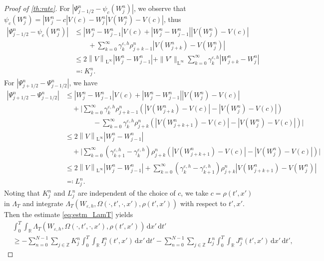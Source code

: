 \documentclass[10pt]{amsart}
\theoremstyle{plain}
\theoremstyle{definition}
\numberwithin{equation}{section}
\newcommand{\eps}{{\varepsilon}}
\newcommand{\norm}[1]{\left\lVert#1\right\rVert}
\newcommand{\dt}{{\, \mathrm{d}t}}
\newcommand{\dx}{{\, \mathrm{d}x}}
\begin{document}
\begin{proof}[Proof of \cref{th:rate}]
For $\left|\Psi_{j-1/2}^n - \psi_c(W_j^n)\right|$, we observe that $\psi_c(W_j^n) = |W_j^n-c|V(c) - W_j^n\left|V(W_j^n)-V(c)\right|$,
thus
\begin{align*}
    \left|\Psi_{j-1/2}^n - \psi_c(W_j^n)\right| &\leq |W_j^n-W_{j-1}^n| V(c) + |W_j^n-W_{j-1}^n|\left|V(W_j^n)-V(c)\right| \\
    &\qquad + \sum_{k=0}^\infty \gamma_k^{\eps,h} \rho_{j+k-1}^n \left|V(W_{j+k}^n)-V(W_j^n)\right| \\
    &\leq 2\norm{V}_{\mathrm{L}^{\infty}} |W_j^n-W_{j-1}^n| + \|V'\|_{\mathrm{L}^\infty} \sum_{k=0}^\infty \gamma_k^{\eps,h} |W_{j+k}^n-W_j^n| \\
    &\eqqcolon K_j^n.
\end{align*}
For $\left|\Psi_{j+1/2}^n - \Psi_{j-1/2}^n\right|$, we have
\begin{align*}
    \left|\Psi_{j+1/2}^n - \Psi_{j-1/2}^n\right| &\leq |W_j^n-W_{j-1}^n| V(c) + |W_j^n-W_{j-1}^n|\left|V(W_j^n)-V(c)\right| \\
    &\quad + \Bigg| \sum_{k=0}^\infty \gamma_k^{\eps,h} \rho_{j+k-1}^n \left(\left|V(W_{j+k}^n)-V(c)\right|-\left|V(W_j^n)-V(c)\right|\right)  \\
    &\qquad\qquad - \sum_{k=0}^\infty \gamma_k^{\eps,h} \rho_{j+k}^n \left(\left|V(W_{j+k+1}^n)-V(c)\right|-\left|V(W_j^n)-V(c)\right|\right) \Bigg| \\
    &\leq 2\norm{V}_{\mathrm{L}^{\infty}} |W_j^n-W_{j-1}^n| \\
    &\quad + \Bigg| \sum_{k=0}^\infty \left(\gamma_{k+1}^{\eps,h}-\gamma_k^{\eps,h}\right) \rho_{j+k}^n \left(\left|V(W_{j+k+1}^n)-V(c)\right|-\left|V(W_j^n)-V(c)\right|\right) \Bigg| \\
    &\leq 2\norm{V}_{\mathrm{L}^{\infty}} |W_j^n-W_{j-1}^n| + \sum_{k=0}^\infty \left(\gamma_k^{\eps,h}-\gamma_{k+1}^{\eps,h}\right) \rho_{j+k}^n \left|V(W_{j+k+1}^n)-V(W_j^n)\right| \\
    &\eqqcolon L_j^n.
\end{align*}
Noting that $K_j^n$ and $L_j^n$ are independent of the choice of $c$, we take $c=\rho(t',x')$ in $\Lambda_T$ and integrate $\Lambda_T(W_{\eps,h}, \Omega(\cdot,t',\cdot,x'),\rho(t',x'))$ with respect to $t',x'$. Then the estimate \cref{eq:estm_LamT} yields
\begin{align*}
    &\int_0^T\int_{\mathbb{R}} \Lambda_T(W_{\eps,h}, \Omega(\cdot,t',\cdot,x'),\rho(t',x')) \dx'\dt' \\
    &\geq -\sum_{n=0}^{N-1} \sum_{j\in\mathbb{Z}} K_j^n \int_0^T\int_{\mathbb{R}} I_j^n(t',x') \dx'\dt' - \sum_{n=0}^{N-1} \sum_{j\in\mathbb{Z}} L_j^n \int_0^T\int_{\mathbb{R}} J_j^n(t',x') \dx'\dt',

\end{align*}
\end{proof}
\end{document}
